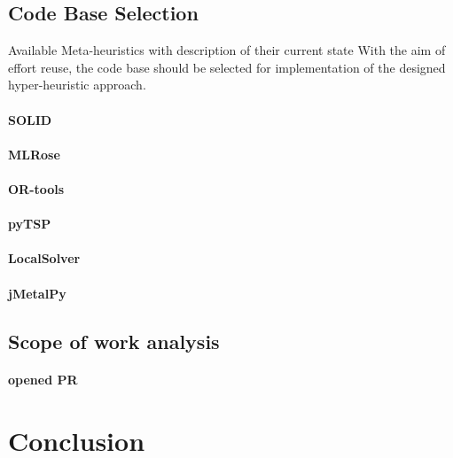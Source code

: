 \subsection{Code Base Selection}\label{implementation:llh code basis selection}
Available Meta-heuristics with description of their current state
With the aim of effort reuse, the code base should be selected for implementation of the designed hyper-heuristic approach.
\paragraph{SOLID}
\paragraph{MLRose}
\paragraph{OR-tools}
\paragraph{pyTSP}
\paragraph{LocalSolver}
\paragraph{jMetalPy}

\subsection{Scope of work analysis}
\paragraph{opened PR}

\section{Conclusion}
